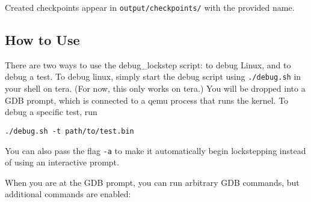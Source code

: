 Created checkpoints appear in \texttt{output/checkpoints/} with the provided name.

\subsection{How to Use}
There are two ways to use the debug\_lockstep script: to debug Linux, and to debug a test. To debug linux, simply start the debug script using \texttt{./debug.sh} in your shell on tera. (For now, this only works on tera.) You will be dropped into a GDB prompt, which is connected to a qemu process that runs the kernel. To debug a specific test, run

\begin{verbatim}
./debug.sh -t path/to/test.bin
\end{verbatim}

You can also pass the flag \texttt{-a} to make it automatically begin lockstepping instead of using an interactive prompt.

When you are at the GDB prompt, you can run arbitrary GDB commands, but additional commands are enabled:

